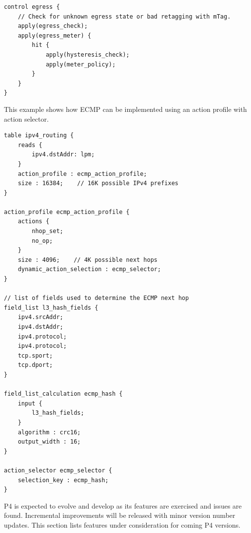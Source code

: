 \documentclass[12pt]{article}
\begin{document}
\begin{itemize}
\begin{lstlisting}[keywords={},frame=single,escapechar=\@]
control egress {
    // Check for unknown egress state or bad retagging with mTag.
    apply(egress_check);
    apply(egress_meter) {
        hit {
            apply(hysteresis_check);
            apply(meter_policy);
        }
    }
}
\end{lstlisting}



This example shows how ECMP can be implemented using an action profile with
action selector.

\begin{lstlisting}[keywords={},frame=single,escapechar=\@]
table ipv4_routing {
    reads {
        ipv4.dstAddr: lpm;
    }
    action_profile : ecmp_action_profile;
    size : 16384;    // 16K possible IPv4 prefixes
}

action_profile ecmp_action_profile {
    actions {
        nhop_set;
        no_op;
    }
    size : 4096;    // 4K possible next hops
    dynamic_action_selection : ecmp_selector;
}

// list of fields used to determine the ECMP next hop
field_list l3_hash_fields {
    ipv4.srcAddr;
    ipv4.dstAddr;
    ipv4.protocol;
    ipv4.protocol;
    tcp.sport;
    tcp.dport;
}

field_list_calculation ecmp_hash {
    input {
        l3_hash_fields;
    }
    algorithm : crc16;
    output_width : 16;
}

action_selector ecmp_selector {
    selection_key : ecmp_hash;
}
\end{lstlisting}



P4 is expected to evolve and develop as its features are exercised and issues 
are found. Incremental improvements will be released with minor version number 
updates. This section lists features under consideration for coming P4 versions.



\end{itemize}
\end{document}
